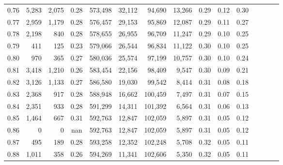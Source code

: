 \begin{tabular}{rrrcrrrrrrrrrrr}
0.76 &   5,283 &  2,075 &                                       0.28 &  573,498 &   32,112 &   94,690 &   13,266 &  0.29 &  0.12 &                         0.30 \\
0.77 &   2,959 &  1,179 &                                       0.28 &  576,457 &   29,153 &   95,869 &   12,087 &  0.29 &  0.11 &                         0.27 \\
0.78 &   2,198 &    840 &                                       0.28 &  578,655 &   26,955 &   96,709 &   11,247 &  0.29 &  0.10 &                         0.25 \\
0.79 &     411 &    125 &                                       0.23 &  579,066 &   26,544 &   96,834 &   11,122 &  0.30 &  0.10 &                         0.25 \\
0.80 &     970 &    365 &                                       0.27 &  580,036 &   25,574 &   97,199 &   10,757 &  0.30 &  0.10 &                         0.24 \\
0.81 &   3,418 &  1,210 &                                       0.26 &  583,454 &   22,156 &   98,409 &    9,547 &  0.30 &  0.09 &                         0.21 \\
0.82 &   3,126 &  1,133 &                                       0.27 &  586,580 &   19,030 &   99,542 &    8,414 &  0.31 &  0.08 &                         0.18 \\
0.83 &   2,368 &    917 &                                       0.28 &  588,948 &   16,662 &  100,459 &    7,497 &  0.31 &  0.07 &                         0.15 \\
0.84 &   2,351 &    933 &                                       0.28 &  591,299 &   14,311 &  101,392 &    6,564 &  0.31 &  0.06 &                         0.13 \\
0.85 &   1,464 &    667 &                                       0.31 &  592,763 &   12,847 &  102,059 &    5,897 &  0.31 &  0.05 &                         0.12 \\
0.86 &       0 &      0 &                                        nan &  592,763 &   12,847 &  102,059 &    5,897 &  0.31 &  0.05 &                         0.12 \\
0.87 &     495 &    189 &                                       0.28 &  593,258 &   12,352 &  102,248 &    5,708 &  0.32 &  0.05 &                         0.11 \\
0.88 &   1,011 &    358 &                                       0.26 &  594,269 &   11,341 &  102,606 &    5,350 &  0.32 &  0.05 &                         0.11 \\

\end{tabular}
